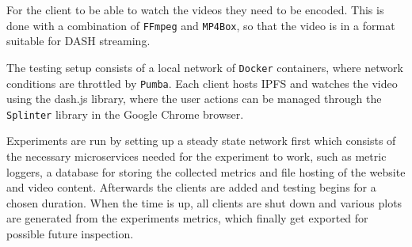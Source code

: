 For the client to be able to watch the videos they need to be encoded. This is done with a combination of \texttt{FFmpeg} and \texttt{MP4Box}, so that the video is in a format suitable for \ac{DASH} streaming.

The testing setup consists of a local network of \texttt{Docker} containers, where network conditions are throttled by \texttt{Pumba}. Each client hosts \ac{IPFS} and watches the video using the dash.js library, where the user actions can be managed through the \texttt{Splinter} library in the Google Chrome browser.

Experiments are run by setting up a steady state network first which consists of the necessary microservices needed for the experiment to work, such as metric loggers, a database for storing the collected metrics and file hosting of the website and video content. Afterwards the clients are added and testing begins for a chosen duration. When the time is up, all clients are shut down and various plots are generated from the experiments metrics, which finally get exported for possible future inspection.
